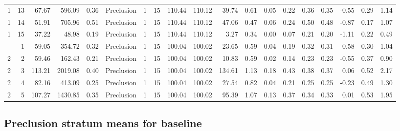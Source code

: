\documentclass[
]{article}
\begin{document}
\begin{table}[!h]
{\begin{tabular}[t]{rrrrrlrrrrrrrrrrrrr}
1 & 13 & 67.67 & 596.09 & 0.36 & Preclusion & 1 & 15 & 110.44 & 110.12 & 39.74 & 0.61 & 0.05 & 0.22 & 0.36 & 0.35 & -0.55 & 0.29 & 1.14\\
1 & 14 & 51.91 & 705.96 & 0.51 & Preclusion & 1 & 15 & 110.44 & 110.12 & 47.06 & 0.47 & 0.06 & 0.24 & 0.50 & 0.48 & -0.87 & 0.17 & 1.07\\
1 & 15 & 37.22 & 48.98 & 0.19 & Preclusion & 1 & 15 & 110.44 & 110.12 & 3.27 & 0.34 & 0.00 & 0.07 & 0.21 & 0.20 & -1.11 & 0.22 & 0.49\\
\addlinespace
2 & 1 & 59.05 & 354.72 & 0.32 & Preclusion & 1 & 15 & 100.04 & 100.02 & 23.65 & 0.59 & 0.04 & 0.19 & 0.32 & 0.31 & -0.58 & 0.30 & 1.04\\
2 & 2 & 59.46 & 162.43 & 0.21 & Preclusion & 1 & 15 & 100.04 & 100.02 & 10.83 & 0.59 & 0.02 & 0.14 & 0.23 & 0.23 & -0.55 & 0.37 & 0.90\\
2 & 3 & 113.21 & 2019.08 & 0.40 & Preclusion & 1 & 15 & 100.04 & 100.02 & 134.61 & 1.13 & 0.18 & 0.43 & 0.38 & 0.37 & 0.06 & 0.52 & 2.17\\
2 & 4 & 82.16 & 413.09 & 0.25 & Preclusion & 1 & 15 & 100.04 & 100.02 & 27.54 & 0.82 & 0.04 & 0.21 & 0.25 & 0.25 & -0.23 & 0.49 & 1.30\\
2 & 5 & 107.27 & 1430.85 & 0.35 & Preclusion & 1 & 15 & 100.04 & 100.02 & 95.39 & 1.07 & 0.13 & 0.37 & 0.34 & 0.33 & 0.01 & 0.53 & 1.95\\
\bottomrule
\end{tabular}}
\end{table}

\subsection{Preclusion stratum means for
baseline}\label{preclusion-stratum-means-for-baseline}
\end{document}
